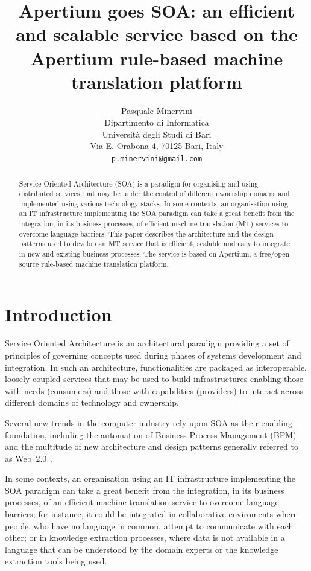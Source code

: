 \documentclass[11pt]{article}
\title{Apertium goes SOA: an efficient and scalable service based on the Apertium rule-based machine translation platform}
\author{Pasquale Minervini\\
  Dipartimento di Informatica\\
  Università degli Studi di Bari\\
  Via E. Orabona 4, 70125 Bari, Italy\\
  {\tt p.minervini@gmail.com}}
\date{}
\begin{document}
\maketitle

\begin{abstract}
Service Oriented Architecture (SOA) is a paradigm for organising and using distributed services that may be under the control of different ownership domains and implemented using various technology stacks. In some contexts, an organisation using an IT infrastructure implementing the SOA paradigm can take a great benefit from the integration, in its business processes, of efficient machine translation (MT) services to overcome language barriers. This paper describes the architecture and the design patterns used to develop an MT service that is efficient, scalable and easy to integrate in new and existing business processes. The service is based on Apertium, a free/open-source rule-based machine translation platform.
\end{abstract}

\section{Introduction}

Service Oriented Architecture is an architectural paradigm providing a set of principles of governing concepts used during phases of systems development and integration. In such an architecture, functionalities are packaged as interoperable, loosely coupled services that may be used to build infrastructures enabling those with needs (consumers) and those with capabilities (providers) to interact across different domains of technology and ownership.

Several new trends in the computer industry rely upon SOA as their enabling foundation, including the automation of Business Process Management (BPM) and the multitude of new architecture and design patterns generally referred to as Web~2.0~\citep{web20}.

In some contexts, an organisation using an IT infrastructure implementing the SOA paradigm can take a great benefit from the integration, in its business processes, of an efficient machine translation service to overcome language barriers; for instance, it could be integrated in collaborative enviroments where people, who have no language in common, attempt to communicate with each other; or in knowledge extraction processes, where data is not available in a language that can be understood by the domain experts or the knowledge extraction tools being used.
\end{document}
